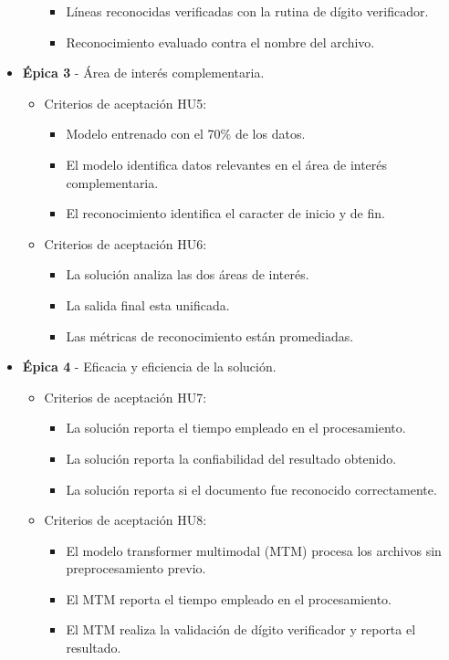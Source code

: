 \documentclass[
11pt, %
]{charter}
\begin{document}
\begin{itemize}
\begin{itemize}
\begin{itemize}
			\item Líneas reconocidas verificadas con la rutina de dígito verificador.
			\item Reconocimiento evaluado contra el nombre del archivo.
	    \end{itemize}
    \end{itemize}
  \item \textbf{\'{E}pica 3} - Área de interés complementaria.
    \begin{itemize}
      \item Criterios de aceptación HU5:
	    \begin{itemize}
			\item Modelo entrenado con el 70\% de los datos.
			\item El modelo identifica datos relevantes en el área de interés complementaria.
			\item El reconocimiento identifica el caracter de inicio y de fin.
	    \end{itemize}
      \item Criterios de aceptación HU6:
	    \begin{itemize}
			\item La solución analiza las dos áreas de interés.
			\item La salida final esta unificada.
			\item Las métricas de reconocimiento están promediadas.
	    \end{itemize}
    \end{itemize}
\newpage
  \item \textbf{\'{E}pica 4} - Eficacia y eficiencia de la solución.
    \begin{itemize}
      \item Criterios de aceptación HU7:
	    \begin{itemize}
			\item La solución reporta el tiempo empleado en el procesamiento.
			\item La solución reporta la confiabilidad del resultado obtenido.
			\item La solución reporta si el documento fue reconocido correctamente.
	    \end{itemize}
      \item Criterios de aceptación HU8:
	    \begin{itemize}
			\item El modelo transformer multimodal (MTM) procesa los archivos sin preprocesamiento previo.
			\item El MTM reporta el tiempo empleado en el procesamiento.
			\item El MTM realiza la validación de dígito verificador y reporta el resultado.
	    \end{itemize}
    \end{itemize}
\end{itemize}
\end{document}
